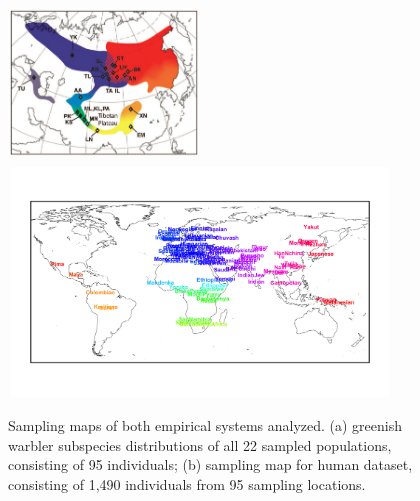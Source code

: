 \documentclass[12pt]{article}
\begin{document}
\begin{figure}
	\centering
			{\includegraphics[width=2in,height=1.66in]{figs/warblers/Irwin_warbler_map_figure.png}}
			{\includegraphics[width=4in,height=2.4in]{figs/globetrotter/globe_world_map_text.png}}
\caption{Sampling maps of both empirical systems analyzed.  (a) greenish warbler subspecies distributions of all 22 sampled populations, consisting of 95 individuals; (b) sampling map for human dataset, consisting of 1,490 individuals from 95 sampling locations.}
\label{sfig:empirical_maps}
\end{figure}
\end{document}
